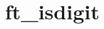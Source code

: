 \chapter{ft\+\_\+isdigit}
\hypertarget{md_Documentation_2ft__isdigit}{}\label{md_Documentation_2ft__isdigit}
